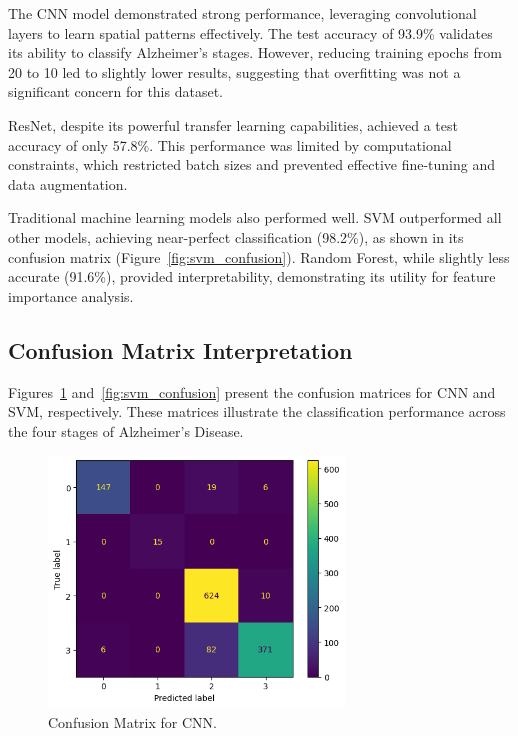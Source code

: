 \documentclass[runningheads]{llncs}
\begin{document}
The CNN model demonstrated strong performance, leveraging convolutional layers to learn spatial patterns effectively. The test accuracy of 93.9\% validates its ability to classify Alzheimer’s stages. However, reducing training epochs from 20 to 10 led to slightly lower results, suggesting that overfitting was not a significant concern for this dataset.

ResNet, despite its powerful transfer learning capabilities, achieved a test accuracy of only 57.8\%. This performance was limited by computational constraints, which restricted batch sizes and prevented effective fine-tuning and data augmentation.

Traditional machine learning models also performed well. SVM outperformed all other models, achieving near-perfect classification (98.2\%), as shown in its confusion matrix (Figure~\ref{fig:svm_confusion}). Random Forest, while slightly less accurate (91.6\%), provided interpretability, demonstrating its utility for feature importance analysis.

\subsection{Confusion Matrix Interpretation}

Figures~\ref{fig:cnn_confusion} and~\ref{fig:svm_confusion} present the confusion matrices for CNN and SVM, respectively. These matrices illustrate the classification performance across the four stages of Alzheimer’s Disease.

\begin{figure}[htbp]
    \centering
    \includegraphics[width=0.7\textwidth]{cnn_confusion_matrix.png}
    \caption{Confusion Matrix for CNN.}
    \label{fig:cnn_confusion}
\end{figure}
\end{document}
